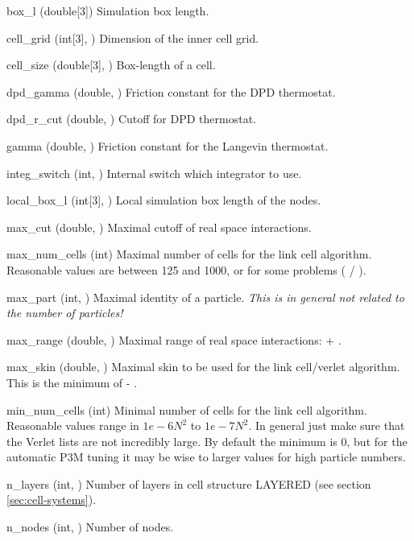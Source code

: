 \begin{globvar}
\item[box_l] (double[3]) Simulation box length.
\item[cell_grid] (int[3], \ro) Dimension of the inner
  cell grid.
\item[cell_size] (double[3], \ro) Box-length of a cell.
\item[dpd_gamma] (double, \ro) Friction constant for the
  DPD thermostat.
\item[dpd_r_cut] (double, \ro) Cutoff for DPD thermostat.
\item[gamma] (double, \ro) Friction constant for the
  Langevin thermostat.
\item[integ_switch] (int, \ro) Internal switch which integrator to
  use.
\item[local_box_l] (int[3], \ro) Local simulation box length of the
  nodes.
\item[max_cut] (double, \ro) Maximal cutoff of real space
  interactions.
\item[max_num_cells] (int) Maximal number of cells for the link cell
  algorithm.  Reasonable values are between 125 and 1000, or for some
  problems ( / ).
\item[max_part] (int, \ro) Maximal identity of a particle.
  \emph{This is in general not related to the number of particles!}
\item[max_range] (double, \ro) Maximal range of real space
  interactions:  + .
\item[max_skin] (double, \ro) Maximal skin to be used for the link
  cell/verlet algorithm. This is the minimum of  -
  . 
\item[min_num_cells] (int)  Minimal number of cells for the
  link cell algorithm. Reasonable values range in $1e-6 N^2$ to $1e-7
  N^2$. In general just make sure that the Verlet lists are not
  incredibly large. By default the minimum is 0, but for the automatic
  P3M tuning it may be wise to larger values for high particle
  numbers.
\item[n_layers] (int, \ro) Number of layers in cell structure LAYERED
  (see section \vref{sec:cell-systems}).
\item[n_nodes] (int, \ro) Number of nodes.

\end{globvar}
